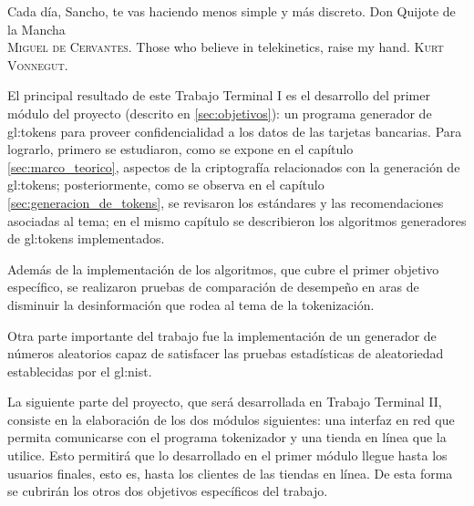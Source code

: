 %
%

{
  \epigrafe
  {%
    Cada día, Sancho, te vas haciendo menos simple y más discreto.%
  }
  {%
    Don Quijote de la Mancha \\
    \textsc{Miguel de Cervantes}.%
  }
  \epigrafe
  {%
    Those who believe in telekinetics, raise my hand.%
  }
  {%
    \textsc{Kurt Vonnegut}.%
  }
}

\noindent
El principal resultado de este Trabajo Terminal I es el desarrollo del primer
módulo del proyecto (descrito en \ref{sec:objetivos}): un programa generador de
\glspl{gl:token} para proveer confidencialidad a los datos de las tarjetas
bancarias. Para lograrlo, primero se estudiaron, como se expone en el capítulo
\ref{sec:marco_teorico}, aspectos de la criptografía relacionados con la
generación de \glspl{gl:token}; posteriormente, como se observa en el capítulo
\ref{sec:generacion_de_tokens}, se revisaron los estándares y las
recomendaciones asociadas al tema; en el mismo capítulo se describieron los
algoritmos generadores de \glspl{gl:token} implementados.

Además de la implementación de los algoritmos, que cubre el primer objetivo
específico, se realizaron pruebas de comparación de desempeño en aras de
disminuir la desinformación que rodea al tema de la tokenización.

Otra parte importante del trabajo fue la implementación de un generador de
números aleatorios capaz de satisfacer las pruebas estadísticas de aleatoriedad
establecidas por el \gls{gl:nist}\footnotemark.


La siguiente parte del proyecto, que será desarrollada en Trabajo Terminal II,
consiste en la elaboración de los dos módulos siguientes: una interfaz en red
que permita comunicarse con el programa tokenizador y una tienda en línea que la
utilice. Esto permitirá que lo desarrollado en el primer módulo llegue hasta los
usuarios finales, esto es, hasta los clientes de las tiendas en línea.
De esta forma se cubrirán los otros dos objetivos específicos del trabajo.

